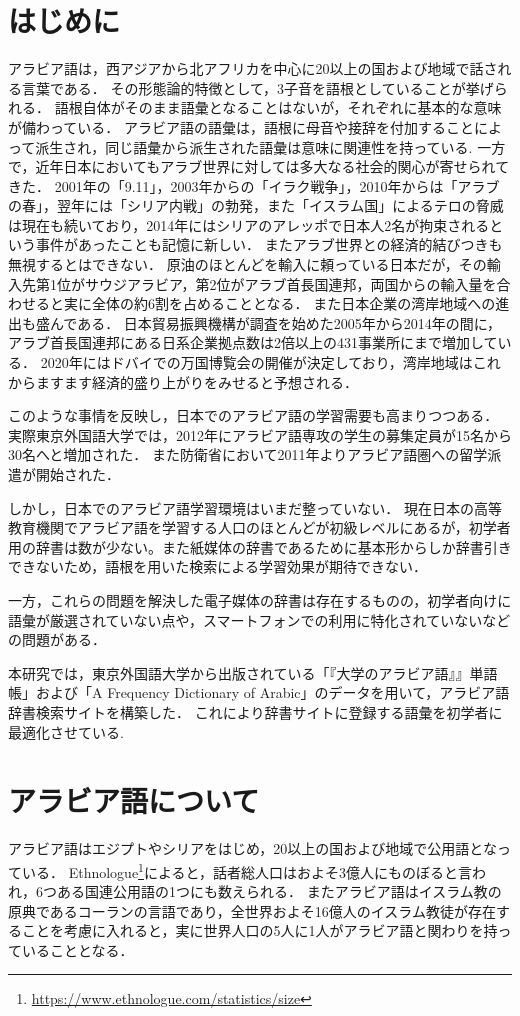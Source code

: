 \documentclass[technicalreport]{ieicej}
\begin{document}
\section{はじめに}
アラビア語は，西アジアから北アフリカを中心に20以上の国および地域で話される言葉である．
その形態論的特徴として，3子音を語根としていることが挙げられる．
語根自体がそのまま語彙となることはないが，それぞれに基本的な意味が備わっている．
アラビア語の語彙は，語根に母音や接辞を付加することによって派生され，同じ語彙から派生された語彙は意味に関連性を持っている. 
一方で，近年日本においてもアラブ世界に対しては多大なる社会的関心が寄せられてきた．
2001年の「9.11」，2003年からの「イラク戦争」，2010年からは「アラブの春」，翌年には「シリア内戦」の勃発，また「イスラム国」によるテロの脅威は現在も続いており，2014年にはシリアのアレッポで日本人2名が拘束されるという事件があったことも記憶に新しい．
またアラブ世界との経済的結びつきも無視するとはできない．
原油のほとんどを輸入に頼っている日本だが，その輸入先第1位がサウジアラビア，第2位がアラブ首長国連邦，両国からの輸入量を合わせると実に全体の約6割を占めることとなる\cite{teikoku}．
また日本企業の湾岸地域への進出も盛んである．
日本貿易振興機構が調査を始めた2005年から2014年の間に，アラブ首長国連邦にある日系企業拠点数は2倍以上の431事業所にまで増加している\cite{jetro}．
2020年にはドバイでの万国博覧会の開催が決定しており，湾岸地域はこれからますます経済的盛り上がりをみせると予想される．

このような事情を反映し，日本でのアラビア語の学習需要も高まりつつある．
実際東京外国語大学では，2012年にアラビア語専攻の学生の募集定員が15名から30名へと増加された．
また防衛省において2011年よりアラビア語圏への留学派遣が開始された\cite{nikkei}．

しかし，日本でのアラビア語学習環境はいまだ整っていない．
現在日本の高等教育機関でアラビア語を学習する人口のほとんどが初級レベルにあるが，初学者用の辞書は数が少ない。また紙媒体の辞書であるために基本形からしか辞書引きできないため，語根を用いた検索による学習効果が期待できない．

一方，これらの問題を解決した電子媒体の辞書は存在するものの，初学者向けに語彙が厳選されていない点や，スマートフォンでの利用に特化されていないなどの問題がある．

本研究では，東京外国語大学から出版されている「『大学のアラビア語』』単語帳」および「A Frequency Dictionary of Arabic」のデータを用いて，アラビア語辞書検索サイトを構築した．
これにより辞書サイトに登録する語彙を初学者に最適化させている.
\section{アラビア語について}
アラビア語はエジプトやシリアをはじめ，20以上の国および地域で公用語となっている．
Ethnologue\footnote{\url{https://www.ethnologue.com/statistics/size}}によると，話者総人口はおよそ3億人にものぼると言われ，6つある国連公用語の1つにも数えられる．
またアラビア語はイスラム教の原典であるコーランの言語であり，全世界およそ16億人のイスラム教徒が存在することを考慮に入れると，実に世界人口の5人に1人がアラビア語と関わりを持っていることとなる．
\end{document}
